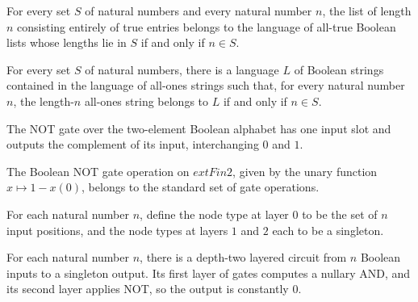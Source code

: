 \begin{theorem}
\label{Language.replicate_mem_unary_iff}
\leanok
{}
For every set $S$ of natural numbers and every natural number $n$, the list of length
$n$ consisting entirely of true entries belongs to the language of all-true Boolean
lists whose lengths lie in $S$ if and only if $n\in S$.
\end{theorem}

\begin{theorem}
\label{Language.exists_le_allOnes}
\leanok
{}
For every set $S$ of natural numbers, there is a language $L$ of Boolean strings
contained in the language of all-ones strings such that, for every natural number $n$,
the length-$n$ all-ones string belongs to $L$ if and only if $n\in S$.
\end{theorem}

\begin{definition}
\label{BoolCircuit.notGateOp}
\leanok
{}
The NOT gate over the two-element Boolean alphabet has one input slot and outputs the
complement of its input, interchanging $0$ and $1$.
\end{definition}

\begin{theorem}
\label{BoolCircuit.notGateOp_mem_stdGateOps}
\leanok
{}
The Boolean NOT gate operation on $	ext{Fin }2$, given by the unary function $x\mapsto
1-x(0)$, belongs to the standard set of gate operations.
\end{theorem}

\begin{definition}
\label{BoolCircuit.constZeroNodes}
\leanok
For each natural number $n$, define the node type at layer $0$ to be the set of $n$
input positions, and the node types at layers $1$ and $2$ each to be a singleton.
\end{definition}

\begin{definition}
\label{BoolCircuit.constZeroCircuit}
\leanok
{}
For each natural number $n$, there is a depth-two layered circuit from $n$ Boolean
inputs to a singleton output. Its first layer of gates computes a nullary AND, and its
second layer applies NOT, so the output is constantly $0$.
\end{definition}

